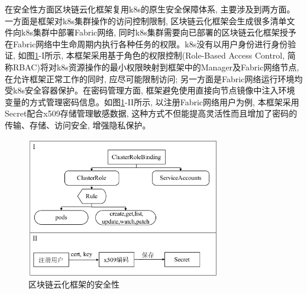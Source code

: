 在安全性方面区块链云化框架复用k8s的原生安全保障体系, 主要涉及到两方面。 一方面是框架对k8s集群操作的访问控制限制, 区块链云化框架会生成很多清单文件向k8s集群中部署Fabric网络, 同时k8s集群需要向已部署的区块链云化框架授予在Fabric网络中生命周期内执行各种任务的权限。k8s没有以用户身份进行身份验证, 如图\ref{safety}-I所示, 本框架采用基于角色的权限控制(Role-Based Access Control, 简称RBAC)将对k8s资源操作的最小权限映射到框架中的Manager及Fabric网络节点, 在允许框架正常工作的同时, 应尽可能限制访问; 另一方面是Fabric网络运行环境均受k8s安全容器保护。在密码管理方面, 框架避免使用直接向节点镜像中注入环境变量的方式管理密码信息。如图\ref{safety}-II所示, 以注册Fabric网络用户为例, 本框架采用Secret配合x509\cite{8249485}存储管理敏感数据, 这种方式不但能提高灵活性而且增加了密码的传输、存储、访问安全, 增强隐私保护。

\begin{figure}[h] %
    \centering %
    \includegraphics[width=0.75\textwidth]{FIGs/chapter3/safety.pdf} %
    \caption{区块链云化框架的安全性} %
    \label{safety} %
\end{figure}%


